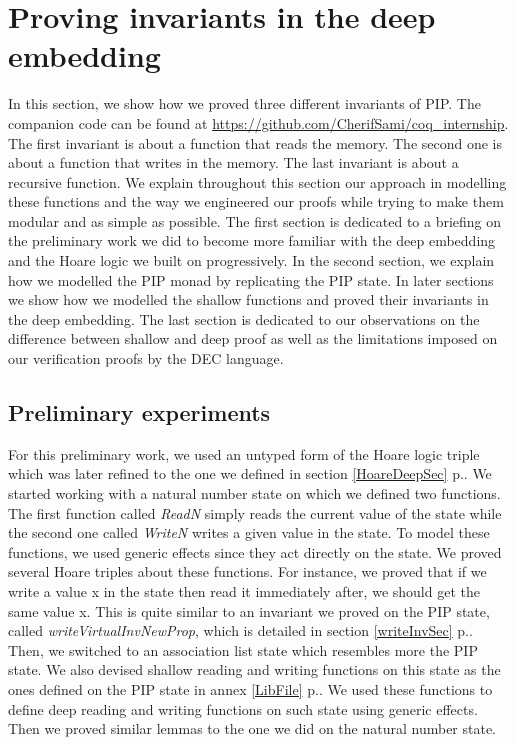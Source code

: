 \chapter{Proving invariants in the deep embedding} \label{Work}
In this section, we show how we proved three different invariants of PIP. The companion code can be found at \url{https://github.com/CherifSami/coq_internship}. The first invariant is about a function that reads the memory. The second one is about a function that writes in the memory. The last invariant is about a recursive function. We explain throughout this section our approach in modelling these functions and the way we engineered our proofs while trying to make them modular and as simple as possible. The first section is dedicated to a briefing on the preliminary work we did to become more familiar with the deep embedding and the Hoare logic we built on progressively. In the second section, we explain how we modelled the PIP monad by replicating the PIP state. In later sections we show how we modelled the shallow functions and proved their invariants in the deep embedding. The last section is dedicated to our observations on the difference between shallow and deep proof as well as the limitations imposed on our verification proofs by the DEC language. 

\section{Preliminary experiments}
For this preliminary work, we used an untyped form of the Hoare logic triple which was later refined to the one we defined in section \ref{HoareDeepSec} p.\pageref{HoareDeepSec}. We started working with a natural number state on which we defined two functions. The first function called \textit{ReadN} simply reads the current value of the state while the second one called \textit{WriteN} writes a given value in the state. To model these functions, we used generic effects since they act directly on the state. We proved several Hoare triples about these functions. For instance, we proved that if we write a value x in the state then read it immediately after, we should get the same value x. This is quite similar to an invariant we proved on the PIP state, called  \textit{writeVirtualInvNewProp}, which is  detailed in section \ref{writeInvSec} p.\pageref{writeInvSec}. Then, we switched to an association list state which resembles more the PIP state. We also devised shallow reading and writing functions on this state as the ones defined on the PIP state in annex \ref{LibFile} p.\pageref{LibFile}. We used these functions to define deep reading and writing functions on such state using generic effects. Then we proved similar lemmas to the one we did on the natural number state. 
 
